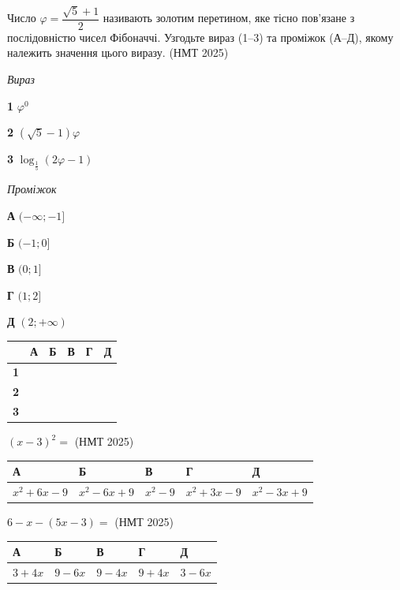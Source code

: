 \documentclass[14pt]{extarticle}
\newcommand{\answerTable}[5]{
\begin{center}
\begin{tabular}{|*{5}{>{\centering\arraybackslash}m{2.8cm}|}}
\hline
\rule[-0.3cm]{0pt}{0.8cm}\textbf{А} & \textbf{Б} & \textbf{В} & \textbf{Г} & \textbf{Д} \\
\hline
\rule[-0.4cm]{0pt}{1.0cm}#1 & \rule[-0.4cm]{0pt}{1.0cm}#2 & \rule[-0.4cm]{0pt}{1.0cm}#3 & \rule[-0.4cm]{0pt}{1.0cm}#4 & \rule[-0.4cm]{0pt}{1.0cm}#5 \\
\hline
\end{tabular}
\end{center}
}
\newcommand{\matchTable}{
\begin{tabular}{|>{\centering\arraybackslash}p{0.25cm}|*{5}{>{\centering\arraybackslash}p{0.25cm}|}}
\hline
& \scriptsize\textbf{А} & \scriptsize\textbf{Б} & \scriptsize\textbf{В} & \scriptsize\textbf{Г} & \scriptsize\textbf{Д} \\
\hline
\scriptsize\textbf{1} & \rule{0pt}{0.25cm} & & & & \\
\hline
\scriptsize\textbf{2} & \rule{0pt}{0.25cm} & & & & \\
\hline
\scriptsize\textbf{3} & \rule{0pt}{0.25cm} & & & & \\
\hline
\end{tabular}
}
\newcommand{\task}[2]{\noindent\makebox[1.5em][l]{\textbf{#1.}}\parbox[t]{\dimexpr\textwidth-1.5em}{#2}}
\newcommand{\nmtyear}[1]{\hfill{\small\color{yearcolor}(НМТ #1)}}
\begin{document}
\vspace{0.5cm}

\task{32}{Число $\varphi = \dfrac{\sqrt{5} + 1}{2}$ називають золотим перетином, яке тісно пов'язане з послідовністю чисел Фібоначчі. Узгодьте вираз (1--3) та проміжок (А--Д), якому належить значення цього виразу. \nmtyear{2025}}

\vspace{0.3cm}
\noindent
\begin{minipage}[t]{0.25\textwidth}
\vspace{0pt}
\textit{Вираз}

\vspace{0.2cm}
\textbf{1} \quad $\varphi^0$

\vspace{0.2cm}
\textbf{2} \quad $(\sqrt{5} - 1)\varphi$

\vspace{0.2cm}
\textbf{3} \quad $\log_{\frac{1}{5}}(2\varphi - 1)$
\end{minipage}
\hfill
\begin{minipage}[t]{0.35\textwidth}
\vspace{0pt}
\textit{Проміжок}

\vspace{0.2cm}
\textbf{А} \quad $(-\infty; -1]$

\vspace{0.2cm}
\textbf{Б} \quad $(-1; 0]$

\vspace{0.2cm}
\textbf{В} \quad $(0; 1]$

\vspace{0.2cm}
\textbf{Г} \quad $(1; 2]$

\vspace{0.2cm}
\textbf{Д} \quad $(2; +\infty)$
\end{minipage}
\hfill
\begin{minipage}[t]{0.18\textwidth}
\vspace{0pt}
\matchTable
\end{minipage}

\vspace{0.7cm}

\task{33}{$(x - 3)^2 =$ \nmtyear{2025}}
\answerTable{$x^2 + 6x - 9$}{$x^2 - 6x + 9$}{$x^2 - 9$}{$x^2 + 3x - 9$}{$x^2 - 3x + 9$}

\vspace{0.5cm}

\task{34}{$6 - x - (5x - 3) =$ \nmtyear{2025}}
\answerTable{$3 + 4x$}{$9 - 6x$}{$9 - 4x$}{$9 + 4x$}{$3 - 6x$}
\end{document}
